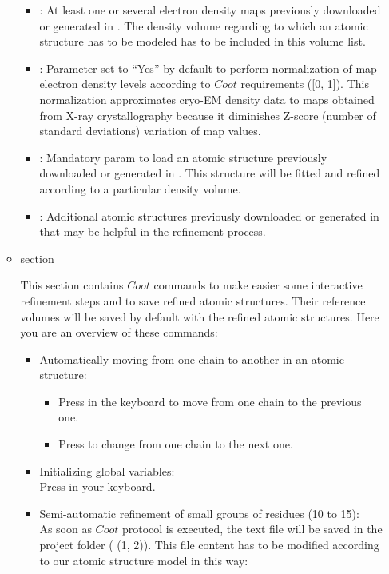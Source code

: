 \begin{itemize}
\begin{itemize}
    \begin{itemize}
     \item {}: At least one or several electron density maps previously downloaded or generated in \scipion. The density volume regarding to which an atomic structure has to be modeled has to be included in this volume list.
     \item {}: Parameter set to ``Yes'' by default to perform normalization of map electron density levels according to $Coot$ requirements ([0, 1]). This normalization approximates cryo-EM density data to maps obtained from X-ray crystallography because it diminishes Z-score (number of standard deviations) variation of map values.  
     \item {}: Mandatory param to load an atomic structure previously downloaded or generated in \scipion. This structure will be fitted and refined according to a particular density volume.
     \item {}: Additional atomic structures previously downloaded or generated in \scipion that may be helpful in the refinement process.
    \end{itemize}
    \item {} section
    
    This section contains $Coot$ commands to make easier some interactive refinement steps and to save refined atomic structures. Their reference volumes will be saved by default with the refined atomic structures. Here you are an overview of these commands:
    \begin{itemize}
     \item Automatically moving from one chain to another in an atomic structure:
     \begin{itemize}
      \item Press  in the keyboard to move from one chain to the previous one.
      \item Press  to change from one chain to the next one.
     \end{itemize} 
     \item Initializing global variables:\\
     Press  in your keyboard.
     \item Semi-automatic refinement of small groups of residues (10 to 15):\\As soon as $Coot$ protocol is executed, the text file  will be saved in the project folder  ( (1, 2)). This file content has to be modified according to our atomic structure model in this way:
     \begin{itemize}


\end{itemize}
\end{itemize}
\end{itemize}
\end{itemize}
